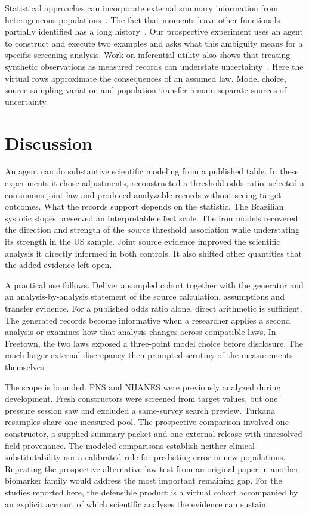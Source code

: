 \documentclass[sigconf,anonymous,review]{acmart}
\begin{document}
Statistical approaches can incorporate external summary information from heterogeneous populations~\cite{syndi}. The fact that moments leave other functionals partially identified has a long history~\cite{bounds}. Our prospective experiment uses an agent to construct and execute two examples and asks what this ambiguity means for a specific screening analysis. Work on inferential utility also shows that treating synthetic observations as measured records can understate uncertainty~\cite{inferential}. Here the virtual rows approximate the consequences of an assumed law. Model choice, source sampling variation and population transfer remain separate sources of uncertainty.

\section{Discussion}
An agent can do substantive scientific modeling from a published table. In these experiments it chose adjustments, reconstructed a threshold odds ratio, selected a continuous joint law and produced analyzable records without seeing target outcomes. What the records support depends on the statistic. The Brazilian systolic slopes preserved an interpretable effect scale. The iron models recovered the direction and strength of the \emph{source} threshold association while understating its strength in the US sample. Joint source evidence improved the scientific analysis it directly informed in both controls. It also shifted other quantities that the added evidence left open.

A practical use follows. Deliver a sampled cohort together with the generator and an analysis-by-analysis statement of the source calculation, assumptions and transfer evidence. For a published odds ratio alone, direct arithmetic is sufficient. The generated records become informative when a researcher applies a second analysis or examines how that analysis changes across compatible laws. In Freetown, the two laws exposed a three-point model choice before disclosure. The much larger external discrepancy then prompted scrutiny of the measurements themselves.

The scope is bounded. PNS and NHANES were previously analyzed during development. Fresh constructors were screened from target values, but one pressure session saw and excluded a same-survey search preview. Turkana resamples share one measured pool. The prospective comparison involved one constructor, a supplied summary packet and one external release with unresolved field provenance. The modeled comparisons establish neither clinical substitutability nor a calibrated rule for predicting error in new populations. Repeating the prospective alternative-law test from an original paper in another biomarker family would address the most important remaining gap. For the studies reported here, the defensible product is a virtual cohort accompanied by an explicit account of which scientific analyses the evidence can sustain.



\appendix

\end{document}
